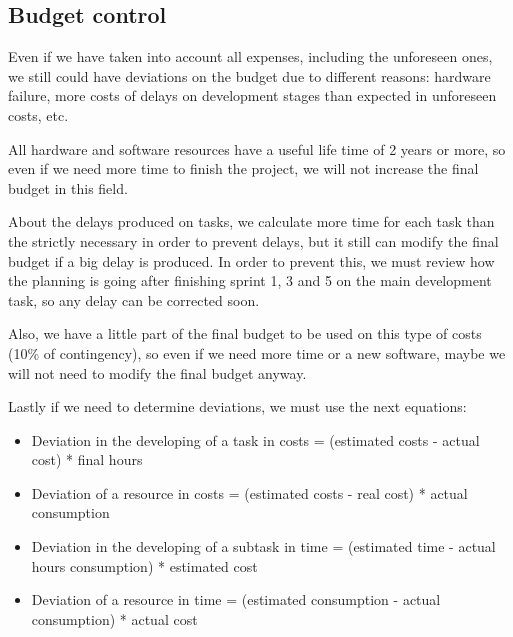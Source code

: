 \subsection{Budget control}
\label{ssec:budgetControl}
Even if we have taken into account all expenses, including the unforeseen ones, we still could have deviations on the budget due to different reasons: hardware failure, more costs of delays on development stages than expected in unforeseen costs, etc.

All hardware and software resources have a useful life time of 2 years or more, so even if we need more time to finish the project, we will not increase the final budget in this field.

About the delays produced on tasks, we calculate more time for each task than the strictly necessary in order to prevent delays, but it still can modify the final budget if a big delay is produced. In order to prevent this, we must review how the planning is going after finishing sprint 1, 3 and 5 on the main development task, so any delay can be corrected soon.

Also, we have a little part of the final budget to be used on this type of costs (10\% of contingency), so even if we need more time or a new software, maybe we will not need to modify the final budget anyway.

Lastly if we need to determine deviations, we must use the next equations:
\begin{itemize}
\item Deviation in the developing of a task in costs = (estimated costs - actual cost) * final hours
\item Deviation of a resource in costs = (estimated costs - real cost) * actual consumption
\item Deviation in the developing of a subtask in time = (estimated time - actual hours consumption) * estimated cost
\item Deviation of a resource in time = (estimated consumption - actual consumption) * actual cost
\end{itemize}
